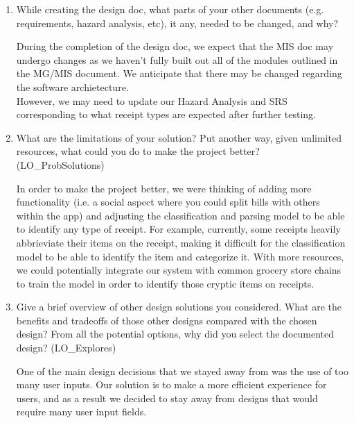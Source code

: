 \documentclass[12pt, titlepage]{article}
\begin{document}
\begin{enumerate}
  \item While creating the design doc, what parts of your other documents (e.g.
  requirements, hazard analysis, etc), it any, needed to be changed, and why?

  During the completion of the design doc, we expect that the MIS doc may undergo changes as we haven't fully built out all of the modules outlined in the MG/MIS document. We anticipate that there
  may be changed regarding the software archietecture.\\
  However, we may need to update our Hazard Analysis and SRS corresponding to what receipt types are expected after further testing.

  \item What are the limitations of your solution?  Put another way, given
  unlimited resources, what could you do to make the project better? (LO\_ProbSolutions)

  In order to make the project better, we were thinking of adding more functionality (i.e. a social aspect where you could split bills with others within the app) and adjusting the classification
  and parsing model to be able to identify any type of receipt. For example, currently, some receipts heavily abbrieviate their items on the receipt, making it difficult for the classification model
  to be able to identify the item and categorize it. With more resources, we could potentially integrate our system with common grocery store chains to train the model in order to identify those
  cryptic items on receipts.

  \item Give a brief overview of other design solutions you considered.  What
  are the benefits and tradeoffs of those other designs compared with the chosen
  design?  From all the potential options, why did you select the documented design?
  (LO\_Explores)

  One of the main design decisions that we stayed away from was the use of too many user inputs. Our solution is to make a more efficient experience for users, and as a result we decided to stay
  away from designs that would require many user input fields. 

\end{enumerate}
\end{document}

